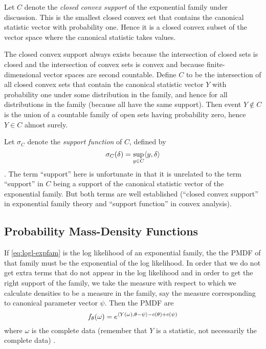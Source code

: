 Let $C$ denote the \emph{closed convex support} of the exponential family
under discussion.  This is the smallest closed convex set that contains
the canonical statistic vector with probability one.  Hence it is a closed
convex subset of the vector space where the canonical statistic takes values.

The closed convex support always exists because the intersection of closed sets
is closed and the intersection of convex sets is convex and because
finite-dimensional vector spaces are second countable.  Define $C$ to be
the intersection of all closed convex sets that contain the canonical
statistic vector $Y$ with probability one under some distribution in the
family, and hence for all distributions in the family (because all have
the same support).  Then event $Y \notin C$ is the
union of a countable family of open sets having probability zero,
hence $Y \in C$ almost surely.

Let $\sigma_C$ denote the \emph{support function} of $C$, defined by
\begin{equation} \label{eq:support-function}
   \sigma_C(\delta) = \sup_{y \in C} \langle y, \delta \rangle
\end{equation}
\citep[Section~8.E]{rockafellar-wets}.  The term ``support'' here is
unfortunate in that it is unrelated to the term ``support'' in $C$ being
a support of the canonical statistic vector of the exponential family.
But both terms are well established (``closed convex support'' in exponential
family theory and ``support function'' in convex analysis).

\subsection{Probability Mass-Density Functions}

If \eqref{eq:logl-expfam} is the log likelihood of an exponential family,
the the PMDF of that family must be the exponential of the log likelihood.
In order that we do not get extra terms that do not appear in the log
likelihood and in order to get the right support of the family, we take
the measure with respect to which we calculate densities to be a measure
in the family, say the measure corresponding to canonical parameter vector
$\psi$.  Then the PMDF are
\begin{equation} \label{eq:pmdf-expfam}
   f_\theta(\omega) = e^{\langle Y(\omega), \theta - \psi \rangle - c(\theta) + c(\psi)}
\end{equation}
where $\omega$ is the complete data (remember that $Y$ is a statistic,
not necessarily the complete data) \citep[Equation~(4)]{geyer-gdor}.

